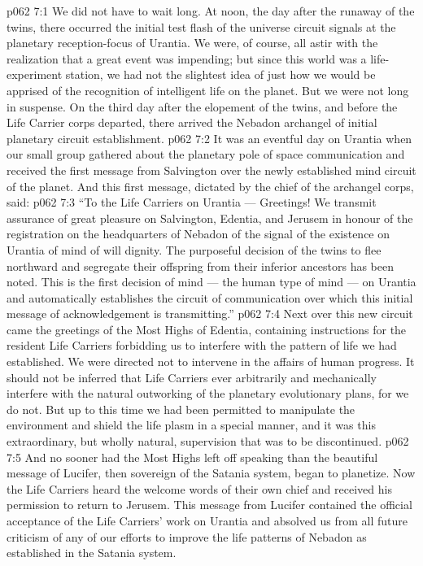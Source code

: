 \vs p062 7:1 We did not have to wait long. At noon, the day after the runaway of the twins, there occurred the initial test flash of the universe circuit signals at the planetary reception\hyp{}focus of Urantia. We were, of course, all astir with the realization that a great event was impending; but since this world was a life\hyp{}experiment station, we had not the slightest idea of just how we would be apprised of the recognition of intelligent life on the planet. But we were not long in suspense. On the third day after the elopement of the twins, and before the Life Carrier corps departed, there arrived the Nebadon archangel of initial planetary circuit establishment.
\vs p062 7:2 It was an eventful day on Urantia when our small group gathered about the planetary pole of space communication and received the first message from Salvington over the newly established mind circuit of the planet. And this first message, dictated by the chief of the archangel corps, said:
\vs p062 7:3 “To the Life Carriers on Urantia --- Greetings! We transmit assurance of great pleasure on Salvington, Edentia, and Jerusem in honour of the registration on the headquarters of Nebadon of the signal of the existence on Urantia of mind of will dignity. The purposeful decision of the twins to flee northward and segregate their offspring from their inferior ancestors has been noted. This is the first decision of mind --- the human type of mind --- on Urantia and automatically establishes the circuit of communication over which this initial message of acknowledgement is transmitting.”
\vs p062 7:4 Next over this new circuit came the greetings of the Most Highs of Edentia, containing instructions for the resident Life Carriers forbidding us to interfere with the pattern of life we had established. We were directed not to intervene in the affairs of human progress. It should not be inferred that Life Carriers ever arbitrarily and mechanically interfere with the natural outworking of the planetary evolutionary plans, for we do not. But up to this time we had been permitted to manipulate the environment and shield the life plasm in a special manner, and it was this extraordinary, but wholly natural, supervision that was to be discontinued.
\vs p062 7:5 And no sooner had the Most Highs left off speaking than the beautiful message of Lucifer, then sovereign of the Satania system, began to planetize. Now the Life Carriers heard the welcome words of their own chief and received his permission to return to Jerusem. This message from Lucifer contained the official acceptance of the Life Carriers’ work on Urantia and absolved us from all future criticism of any of our efforts to improve the life patterns of Nebadon as established in the Satania system.
